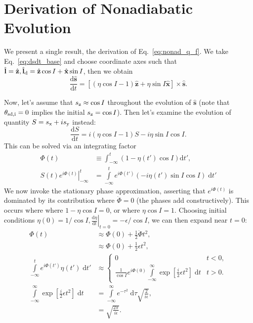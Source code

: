 \documentclass[
        fleqn,
        usenatbib,
    ]{mnras}
\newcommand*{\rd}[2]{\frac{\mathrm{d}#1}{\mathrm{d}#2}}
\newcommand*{\at}[1]{\left.#1\right|}
\newcommand*{\bm}[1]{\boldsymbol{\mathbf{#1}}}
\newcommand*{\uv}[1]{\hat{\bm{#1}}}
\newcommand*{\p}[1]{\left(#1\right)}
\newcommand*{\s}[1]{\left[#1\right]}
\begin{document}
\section{Derivation of Nonadiabatic Evolution}\label{s:nonad_app}

We present a single result, the derivation of Eq.~\eqref{eq:nonad_q_f}. We take
Eq.~\eqref{eq:dsdt_base} and choose coordinate axes such that $\uv{l} = \uv{z},
\uv{l}_{\rm d} = \uv{z} \cos I + \uv{x}\sin I$, then we obtain
\begin{equation}
    \rd{\uv{s}}{t} = \s{
        \p{\eta \cos I - 1}\uv{z} + \eta \sin I \uv{x}} \times \uv{s}.
\end{equation}

Now, let's assume that $s_{\rm z} \approx \cos I$ throughout the evolution of
$\uv{s}$ (note that $\theta_{\rm sd, i} = 0$ implies the initial $s_{\rm z} = \cos
I$). Then let's examine the evolution of quantity $S = s_{\rm x} + is_{\rm y}$ instead:
\begin{equation}
    \rd{S}{t} = i\p{\eta\cos I - 1}S - i \eta \sin I\cos I.\label{eq:nonad_ode}
\end{equation}
This can be solved via an integrating factor
\begin{align}
    \Phi(t) &\equiv \int_{-\infty}^t \p{1 - \eta(t') \cos I}
        \mathrm{d}t',\\
    \at{S(t) e^{i\Phi(t)}}_{-\infty}^t
        &= \int\limits_{-\infty}^t e^{i\Phi(t')}
            \p{-i\eta(t')\sin I\cos I}\;\mathrm{d}t'\label{eq:nonad_int}
\end{align}
We now invoke the stationary phase approximation, asserting that $e^{i\Phi(t)}$
is dominated by its contribution where $\dot{\Phi} = 0$ (the phases add
constructively). This occurs where where $1 - \eta\cos I = 0$, or where
$\eta\cos I = 1$. Choosing initial conditions $\eta(0) = 1/\cos I,
\at{\rd{\eta}{t}}_{t=0} = -\epsilon/\cos I$, we can then expand near $t = 0$:
\begin{align}
    \Phi(t) &\approx \Phi(0) + \frac{1}{2}\ddot{\Phi}t^2,\\
        &\approx \Phi(0) + \frac{1}{2}\epsilon t^2,\\
    \int\limits_{-\infty}^t e^{i\Phi(t')}\eta(t')\;\mathrm{d}t'
        &\approx
        \begin{cases}
            0 & t < 0,\\
            \frac{1}{\cos I}e^{i\Phi(0)}\int\limits_{-\infty}^\infty
                \exp\s{\frac{i}{2}\epsilon t^2}\;\mathrm{d}t
                & t > 0.
        \end{cases}\label{eq:app_phase}\\
    \int\limits_{-\infty}^\infty
                \exp\s{\frac{i}{2}\epsilon t^2}\;\mathrm{d}t
        &= \int\limits_{-\infty}^\infty e^{-\tau^2}\;\mathrm{d}\tau
            \sqrt{\frac{2}{i\epsilon}},\\
        &= \sqrt{\frac{2\pi}{i\epsilon}}.
\end{align}
\end{document}
